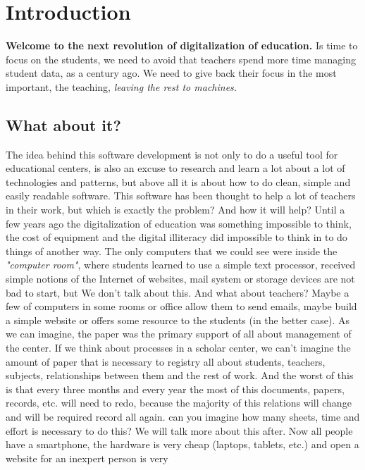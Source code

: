 \chapter{Introduction}

\textbf{Welcome to the next revolution of digitalization of education.}
\intro
Is time to focus on the students, we need to avoid that teachers spend more
time managing student data, as a century ago. We need to give back their focus
in the most important, the teaching, \textit{leaving the rest to machines.}


\section{What about it?}

The idea behind this software development is not only to do a
useful tool for educational centers, is also an excuse to research and
learn a lot about a lot of technologies and patterns, but above all it is
about how to do clean, simple and easily readable software.
\intro
This software has been thought to help a lot of teachers in their work, but which
is exactly the problem? And how it will help?
\intro
Until a few years ago the digitalization of education was something
impossible to think, the cost of equipment and the digital illiteracy did impossible
to think in to do things of another way. The only computers
that we could see were inside the \textit{"computer room"}, where students learned
to use a simple text processor, received simple notions of the Internet
of websites, mail system or storage devices are not bad to start, but
We don't talk about this. And what about teachers? Maybe a few of
computers in some rooms or office allow them to send emails, maybe build
a simple website or offers some resource to the students (in the better case).
As we can imagine, the paper was the primary support of all
about management of the center.
\intro
If we think about processes in a scholar center, we can't imagine
the amount of paper that is necessary to registry all about students,
teachers, subjects, relationships between them and the rest of work.
And the worst of this is that every three months and every year the
most of this documents, papers, records, etc. will need to redo, because
the majority of this relations will change and will be required record
all again.
\intro
can you imagine how many sheets, time and effort is necessary
to do this? We will talk more about this after.
\intro
Now all people have a smartphone,  the hardware is very cheap (laptops,
tablets, etc.) and open a website for an inexpert person is very
